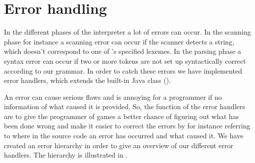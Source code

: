 \section{Error handling}
\label{sec:errorhandling}

In the different phases of the interpreter a lot of errors can occur. In the
scanning phase for instance a scanning error can occur if the scanner detects a
string, which doesn't correspond to one of \productname{}'s specified lexemes. In
the parsing phase a syntax error can occur if two or more tokens are not set up
syntactically correct according to our grammar. In order to catch these errors
we have implemented error handlers, which extends the built-in Java class
 (). 

An error can cause serious flaws and is annoying for a programmer if no
information of what caused it is provided. So, the function of the error
handlers are to give the programmer of \productname{} games a better chance of
figuring out what has been done wrong and make it easier to correct the errors
by for instance referring to where in the source code an error has occurred and
what caused it. We have created an error hierarchy in order to give an overview
of our different error handlers. The hierarchy is illustrated in
. 



